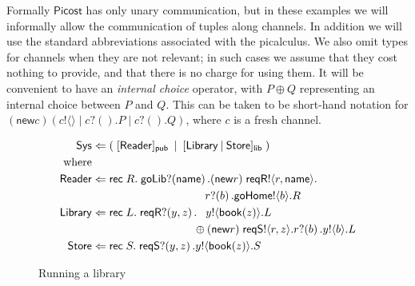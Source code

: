 \documentclass{LMCS}
\newcommand{\pfn}[1]{\mathsf{#1}}  \newcommand{\cfn}[1]{\mathsf{#1}}  \newcommand{\ownfnt}[1]{{\mathsf{#1}}}
\newcommand{\picost}{\ensuremath{\pfn{Picost}}\xspace}
\newcommand{\pa}[1]{\!\left(#1\right)}
\newcommand{\pc}[1]{\langle#1\rangle}
\newcommand{\CnewNT}[1]{(\pfn{new} {#1})}
\newcommand{\Cpar}{\mathbin{|}}
\newcommand{\Crec}[2]{\pfn{rec}\;#1.\;#2}
\newcommand{\Cloc}[2]{[#1]_{\ownfnt{#2}}}
\begin{document}
\newcommand{\news}{\cfn{news}}
\newcommand{\publish}{\cfn{publish}}
\newcommand{\adv}{\cfn{adv}}

Formally \picost has only unary communication, but
in these examples we will informally allow the communication of tuples
along channels. In addition we will use the standard abbreviations
associated with the picalculus.  We also omit types for channels when
they are not relevant; in such cases we assume that they cost nothing
to provide, and that there is no charge for using them.  It will be
convenient to have an \emph{internal choice} operator, with $P \oplus
Q$ representing an internal choice between $P$ and $Q$.  This can be
taken to be short-hand notation for $\CnewNT{c}( c!\pc{} \Cpar
c?\pa{}.P \Cpar c?\pa{}. Q)$, where $c$ is a fresh channel.





\begin{figure}[t]


  \begin{align*}
\Sys       &\Leftarrow (\;\Cloc{\Reader}{\Cpublic} \;\Cpar\; 
                        \Cloc{\Library \Cpar \Store}{\Clib}\; ) \\
\text{where}\\
    \Reader &\Leftarrow \Crec{R} {\goLib?\pa{\Cname}. \CnewNT{r}\; \reqR!\pc{r,\Cname}. \\
            &\phantom{\Leftarrow \Crec{x} {\goLib?\pa{\Cname}.}}    r?\pa{b}. \goHome!\pc{b}. R}\\
\Library &\Leftarrow \Crec{L}{ \reqR?\pa{y,z}. \phantom{\oplus} y!\pc{\Cbook(z)}. L\\
            &\phantom{\Leftarrow \Crec{x}{ \reqR?\pa{x,y}.}} \oplus 
                   \CnewNT{r} \;\reqS!\pc{r,z}. r?\pa{b}. y!\pc{b}. L}\\
  \Store    &\Leftarrow \Crec{S}{\reqS?\pa{y,z}. y!\pc{\Cbook(z)}. S}\\
\end{align*}
  \caption{Running a library}
  \label{fig:lib}
\end{figure}
\end{document}
